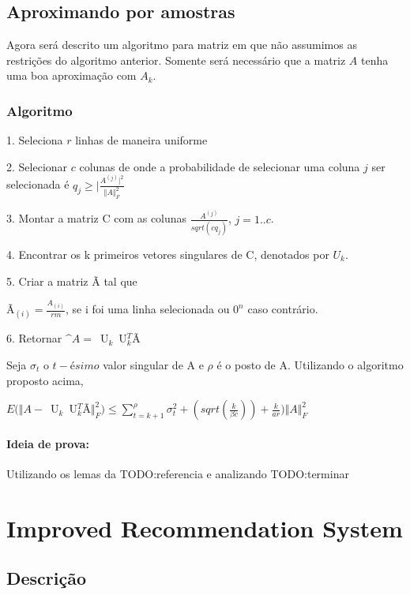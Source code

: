 \documentclass[a4paper,10pt]{article}
\begin{document}
\subsection{Aproximando por amostras}

Agora será descrito um algoritmo para matriz em que não assumimos as restrições
do algoritmo anterior. Somente será necessário que a matriz $A$ tenha uma boa 
aproximação com $A_k$.

\subsubsection{Algoritmo}

1. Seleciona $r$ linhas de maneira uniforme

2. Selecionar $c$ colunas de onde a probabilidade de selecionar uma coluna $j$ ser selecionada 
é  $q_j \geq \vert \frac{A^{(j)} \vert^2}{\Vert A \Vert^2_F}$

3. Montar a matriz C com as colunas $\frac{A^(j)}{sqrt(cq_j)}$, $j = 1 .. c$.

4. Encontrar os k primeiros vetores singulares de C, denotados por $U_k$.

5. Criar a matriz Ã tal que 

Ã$_{(i)}  = \frac{A_{(i)}}{rm}$, se i foi uma linha selecionada ou $0^n$ caso contrário.

6. Retornar $\^A = $~U$_k$~U$_k^T$Ã


\begin{teo}
Seja $\sigma_t$ o $t-ésimo$ valor singular de A e $\rho$ é o posto de A. Utilizando
o algoritmo proposto acima, 

$E(\Vert A - $~U$_k$~U$_k^T$Ã$ \Vert^2_F) \leq \sum_{t = k + 1}^\rho \sigma_t^2 + 
(sqrt(\frac{k}{\beta c}))  + \frac{k}{ar})\Vert A \Vert^2_F
$
\end{teo}

\paragraph{Ideia de prova:} Utilizando os lemas da TODO:referencia e 
analizando TODO:terminar

\section{Improved Recommendation System}

\subsection{Descrição}
\end{document}
